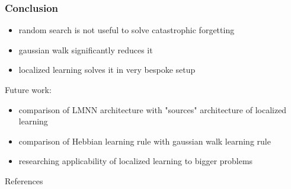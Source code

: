 \documentclass[14pt]{beamer}
\theoremstyle{remark}
\begin{document}
\begin{frame}[t]
    \frametitle{Conclusion}

    \begin{itemize}
        \item random search is not useful to solve catastrophic forgetting
        \vfill
        \item gaussian walk significantly reduces it
        \vfill
        \item localized learning solves it in very bespoke setup
	\end{itemize}

    Future work:
    \begin{itemize}
        \item comparison of LMNN architecture with "sources" architecture of
              localized learning
        \vfill
        \item comparison of Hebbian learning rule with gaussian walk learning rule
        \vfill
        \item researching applicability of localized learning to bigger problems
    \end{itemize}
\end{frame}



\begin{frame}[allowframebreaks]{References}
    \printbibliography
\end{frame}
\end{document}
